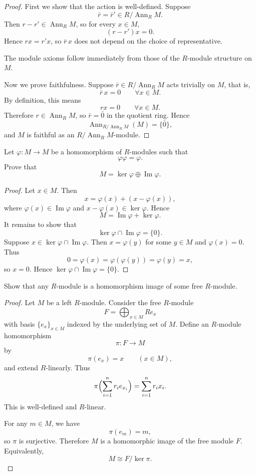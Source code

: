 \begin{proof}
    First we show that the action is well-defined. Suppose
    \[
        \bar r=\bar r' \in R/\operatorname{Ann}_R M.
    \]
    Then $r-r'\in \operatorname{Ann}_R M$, so for every $x\in M$,
    \[
        (r-r')x=0.
    \]
    Hence $rx=r'x$, so $\bar r\,x$ does not depend on the choice of representative.

    The module axioms follow immediately from those of the $R$-module structure on $M$.

    Now we prove faithfulness. Suppose $\bar r\in R/\operatorname{Ann}_R M$ acts trivially on $M$, that is,
    \[
        \bar r\,x=0 \qquad \forall x\in M.
    \]
    By definition, this means
    \[
        rx=0 \qquad \forall x\in M.
    \]
    Therefore $r\in \operatorname{Ann}_R M$, so $\bar r=\bar 0$ in the quotient ring. Hence
    \[
        \operatorname{Ann}_{R/\operatorname{Ann}_R M}(M)=\{\bar 0\},
    \]
    and $M$ is faithful as an $R/\operatorname{Ann}_R M$-module.
\end{proof}

\begin{exercise}
    Let $\varphi : M \to M$ be a homomorphism of $R$-modules such that
    \[
        \varphi\varphi=\varphi.
    \]
    Prove that
    \[
        M=\ker\varphi \oplus \operatorname{Im}\varphi.
    \]
\end{exercise}

\begin{proof}
    Let $x \in M$. Then
    \[
        x = \varphi(x) + (x - \varphi(x)),
    \]
    where $\varphi(x) \in \operatorname{Im}\varphi$ and $x - \varphi(x) \in \ker\varphi$. Hence
    \[
        M = \operatorname{Im}\varphi + \ker\varphi.
    \]
    It remains to show that
    \[
        \ker\varphi \cap \operatorname{Im}\varphi = \{0\}.
    \]
    Suppose $x \in \ker\varphi \cap \operatorname{Im}\varphi$. Then $x = \varphi(y)$ for some $y \in M$ and $\varphi(x) = 0$. Thus
    \[
        0 = \varphi(x) = \varphi(\varphi(y)) = \varphi(y)=x,
    \]
    so $x = 0$. Hence $\ker\varphi \cap \operatorname{Im}\varphi = \{0\}$.
\end{proof}

\begin{exercise}
    Show that any $R$-module is a homomorphism image of some free $R$-module.
\end{exercise}

\begin{proof}
    Let $M$ be a left $R$-module. Consider the free $R$-module
    \[
        F=\bigoplus_{x\in M} Re_x
    \]
    with basis $\{e_x\}_{x\in M}$ indexed by the underlying set of $M$.
    Define an $R$-module homomorphism
    \[
        \pi:F\to M
    \]
    by
    \[
        \pi(e_x)=x \qquad (x\in M),
    \]
    and extend $R$-linearly. Thus
    \[
        \pi\Bigl(\sum_{i=1}^n r_i e_{x_i}\Bigr)=\sum_{i=1}^n r_i x_i.
    \]
    This is well-defined and $R$-linear.

    For any $m\in M$, we have
    \[
        \pi(e_m)=m,
    \]
    so $\pi$ is surjective. Therefore $M$ is a homomorphic image of the free module $F$.
    Equivalently,
    \[
        M\cong F/\ker\pi.
    \]
\end{proof}

